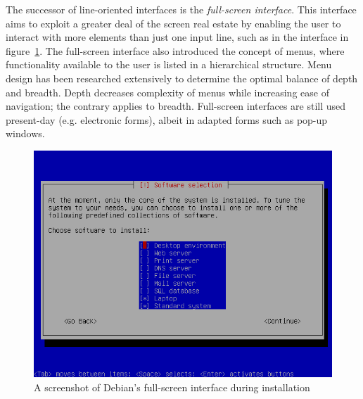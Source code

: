 The successor of line-oriented interfaces is the \textit{full-screen interface}. This interface aims to exploit a greater deal of the screen real estate by enabling the user to interact with more elements than just one input line, such as in the interface in figure~\ref{figure:fullscreeninterface}. The full-screen interface also introduced the concept of menus, where functionality available to the user is listed in a hierarchical structure. Menu design has been researched extensively\cite{paap1986optimal, landauer1985selection, fisher1990optimal} to determine the optimal balance of depth and breadth. Depth decreases complexity of menus while increasing ease of navigation; the contrary applies to breadth. Full-screen interfaces are still used present-day (e.g. electronic forms), albeit in adapted forms such as pop-up windows.

\begin{figure}
	\centering
	\includegraphics[scale=.5]{figures/debiannetinstall}
	\caption{A screenshot of Debian's full-screen interface during installation}
	\label{figure:fullscreeninterface}
\end{figure}


